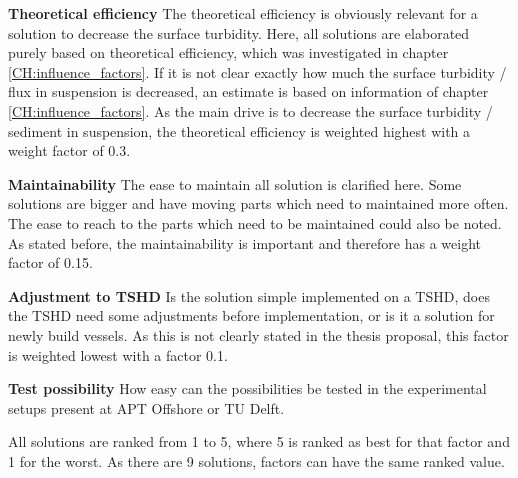 \noindent \textbf{Theoretical efficiency}\newline
The theoretical efficiency is obviously relevant for a solution to decrease the surface turbidity. Here, all solutions are elaborated purely based on theoretical efficiency, which was investigated in chapter \ref{CH:influence_factors}. If it is not clear exactly how much the surface turbidity / flux in suspension is decreased, an estimate is based on information of chapter \ref{CH:influence_factors}. As the main drive is to decrease the surface turbidity / sediment in suspension, the theoretical efficiency is weighted highest with a weight factor of 0.3.\newline

\noindent \textbf{Maintainability}\newline
The ease to maintain all solution is clarified here. Some solutions are bigger and have moving parts which need to maintained more often. The ease to reach to the parts which need to be maintained could also be noted. As stated before, the maintainability is important and therefore has a weight factor of 0.15. \newline

\noindent \textbf{Adjustment to TSHD}\newline
Is the solution simple implemented on a TSHD, does the TSHD need some adjustments before implementation, or is it a solution for newly build vessels. As this is not clearly stated in the thesis proposal, this factor is weighted lowest with a factor 0.1. \newline

\noindent \textbf{Test possibility} \newline
How easy can the possibilities be tested in the experimental setups present at APT Offshore or TU Delft. \newline

\noindent All solutions are ranked from 1 to 5, where 5 is ranked as best for that factor and 1 for the worst. As there are 9 solutions, factors can have the same ranked value. 




